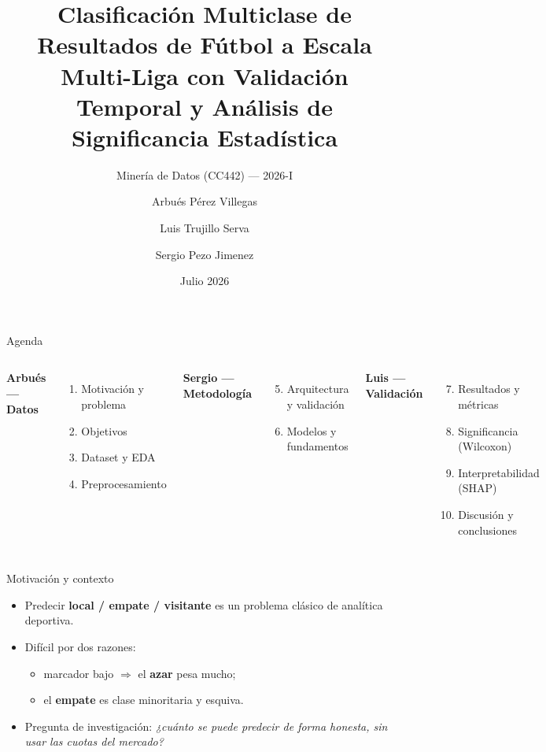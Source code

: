 \documentclass[aspectratio=169]{beamer}
\title[Predicción de resultados de fútbol]{Clasificación Multiclase de Resultados de Fútbol
a Escala Multi-Liga con Validación Temporal y Análisis de Significancia Estadística}
\subtitle{Minería de Datos (CC442) --- 2026-I}
\author[Pérez, Trujillo, Pezo]{Arbués Pérez Villegas \and Luis Trujillo Serva \and Sergio Pezo Jimenez}
\institute[UNI]{Universidad Nacional de Ingeniería --- Ciencia de la Computación}
\date{Julio 2026}
\begin{document}
\begin{frame}[plain]
  \titlepage
\end{frame}

\begin{frame}{Agenda}
  \begin{columns}[t]
    \textbf{Arbués --- Datos}
    \begin{enumerate}
      \item Motivación y problema
      \item Objetivos
      \item Dataset y EDA
      \item Preprocesamiento
    \end{enumerate}
    \textbf{Sergio --- Metodología}
    \begin{enumerate}\setcounter{enumi}{4}
      \item Arquitectura y validación
      \item Modelos y fundamentos
    \end{enumerate}
    \textbf{Luis --- Validación}
    \begin{enumerate}\setcounter{enumi}{6}
      \item Resultados y métricas
      \item Significancia (Wilcoxon)
      \item Interpretabilidad (SHAP)
      \item Discusión y conclusiones
    \end{enumerate}
  \end{columns}
\end{frame}

\begin{frame}{Motivación y contexto}
  \begin{itemize}
    \item Predecir \textbf{local / empate / visitante} es un problema clásico de analítica deportiva.
    \item Difícil por dos razones:
    \begin{itemize}
      \item marcador bajo $\Rightarrow$ el \textbf{azar} pesa mucho;
      \item el \textbf{empate} es clase minoritaria y esquiva.
    \end{itemize}
    \item Pregunta de investigación: \emph{¿cuánto se puede predecir de forma honesta,
    sin usar las cuotas del mercado?}
  \end{itemize}
\end{frame}
\end{document}
